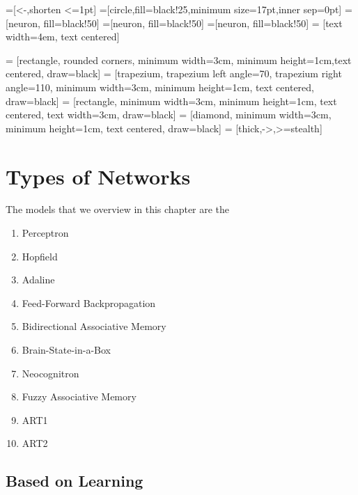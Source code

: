 \documentclass[12pt, right open]{memoir}
\begin{document}

=[<-,shorten <=1pt]
=[circle,fill=black!25,minimum size=17pt,inner sep=0pt]
=[neuron, fill=black!50]
=[neuron, fill=black!50]
=[neuron, fill=black!50]
 = [text width=4em, text centered]

 = [rectangle, rounded corners, minimum width=3cm, minimum height=1cm,text centered, draw=black]
 = [trapezium, trapezium left angle=70, trapezium right angle=110, minimum width=3cm, minimum height=1cm, text centered, draw=black]
 = [rectangle, minimum width=3cm, minimum height=1cm, text centered, text width=3cm, draw=black]
 = [diamond, minimum width=3cm, minimum height=1cm, text centered, draw=black]
 = [thick,->,>=stealth]

\chapter{Types of Networks}


The models that we overview in this chapter are the \\

\begin{enumerate}
\item Perceptron
\item Hopfield
\item Adaline
\item Feed-Forward Backpropagation
\item Bidirectional Associative Memory
\item Brain-State-in-a-Box
\item Neocognitron
\item Fuzzy Associative Memory
\item ART1
\item ART2
\end{enumerate}


\section{Based on Learning}
\end{document}
